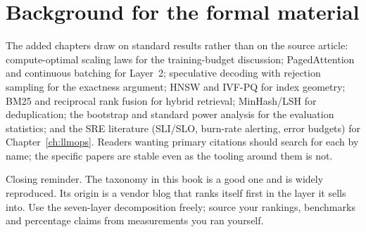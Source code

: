 \documentclass[11pt,twoside,openright]{book}
\theoremstyle{definition}
\theoremstyle{plain}
\theoremstyle{remark}
\begin{document}
\section*{Background for the formal material}

The added chapters draw on standard results rather than on the source article:
compute-optimal scaling laws for the training-budget discussion;
PagedAttention and continuous batching for Layer~2;
speculative decoding with rejection sampling for the exactness argument;
HNSW and IVF-PQ for index geometry;
BM25 and reciprocal rank fusion for hybrid retrieval;
MinHash/LSH for deduplication;
the bootstrap and standard power analysis for the evaluation statistics;
and the SRE literature (SLI/SLO, burn-rate alerting, error budgets) for
Chapter~\ref{ch:llmops}. Readers wanting primary citations should search for
each by name; the specific papers are stable even as the tooling around them is
not.

\vspace{1em}
\begin{vendorwatch}
Closing reminder. The taxonomy in this book is a good one and is widely
reproduced. Its origin is a vendor blog that ranks itself first in the layer it
sells into. Use the seven-layer decomposition freely; source your rankings,
benchmarks and percentage claims from measurements you ran yourself.
\end{vendorwatch}
\end{document}
